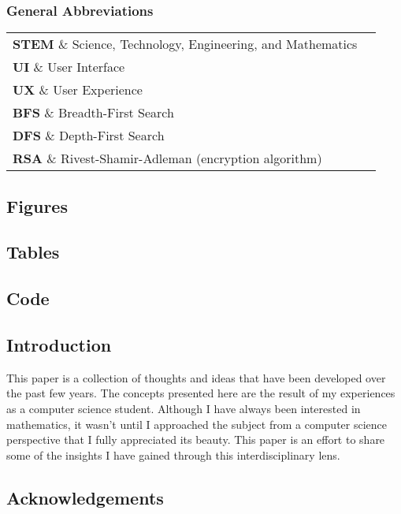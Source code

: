 \subsubsection{General Abbreviations}

\begin{tabular}{ll}
    \textbf{STEM} \& Science, Technology, Engineering, and Mathematics \\
    \textbf{UI} \& User Interface \\
    \textbf{UX} \& User Experience \\
    \textbf{BFS} \& Breadth-First Search \\
    \textbf{DFS} \& Depth-First Search \\
    \textbf{RSA} \& Rivest-Shamir-Adleman (encryption algorithm) \\
\end{tabular}

\subsection{Figures} \listoffigures %

\subsection{Tables} \listoftables

\subsection{Code} \lstlistoflistings

\subsection{Introduction}

This paper is a collection of thoughts and ideas that have been developed over the past few years. The concepts presented here are the result of my experiences as a computer science student. Although I have always been interested in mathematics, it wasn't until I approached the subject from a computer science perspective that I fully appreciated its beauty. This paper is an effort to share some of the insights I have gained through this interdisciplinary lens.

\subsection{Acknowledgements}

